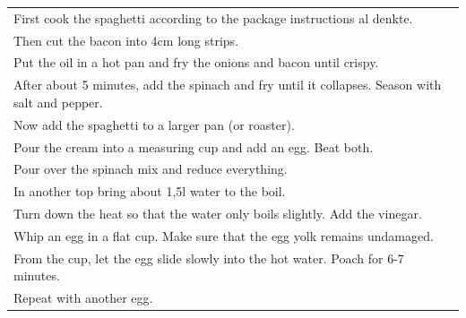 \begin{tabular}{p{15cm}}
	\\
  First cook the spaghetti according to the package instructions al denkte.\\
  Then cut the bacon into 4cm long strips.\\
  Put the oil in a hot pan and fry the onions and bacon until crispy.\\
  After about 5 minutes, add the spinach and fry until it collapses. Season with salt and pepper.\\
  Now add the spaghetti to a larger pan (or roaster).\\
  Pour the cream into a measuring cup and add an egg. Beat both.\\
  Pour over the spinach mix and reduce everything.\\
  In another top bring about 1,5l water to the boil.\\
  Turn down the heat so that the water only boils slightly. Add the vinegar.\\
  Whip an egg in a flat cup. Make sure that the egg yolk remains undamaged.\\
  From the cup, let the egg slide slowly into the hot water. Poach for 6-7 minutes.\\
  Repeat with another egg.
\end{tabular}
